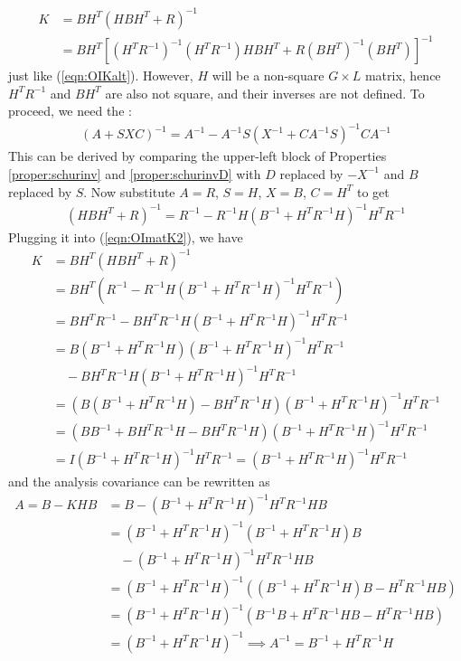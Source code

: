 \begin{align*}
K &= BH^T(HBH^T+R)^{-1} \\
&= BH^T[(H^TR^{-1})^{-1}(H^TR^{-1})HBH^T+R(BH^T)^{-1}(BH^T)]^{-1} 
\end{align*}
just like (\ref{eqn:OIKalt}). However, $H$ will be a non-square $G \times L$ matrix, hence $H^TR^{-1}$ and $BH^T$ are also not square, and their inverses are not defined. To proceed, we need the :
\begin{align}
(A + SXC)^{-1} = A^{-1} - A^{-1}S(X^{-1} + CA^{-1}S)^{-1}CA^{-1}
\end{align}
This can be derived by comparing the upper-left block of Properties \ref{proper:schurinv} and \ref{proper:schurinvD} with $D$ replaced by $-X^{-1}$ and $B$ replaced by $S$. Now substitute $A = R$, $S = H$, $X = B$, $C=H^T$ to get
\begin{align}
(HBH^T + R)^{-1} = R^{-1} - R^{-1}H(B^{-1} + H^TR^{-1}H)^{-1}H^T R^{-1}    
\end{align}
Plugging it into (\ref{eqn:OImatK2}), we have
\begin{align}
K &= BH^T(HBH^T+R)^{-1} \nonumber \\
&= BH^T(R^{-1} - R^{-1}H(B^{-1} + H^TR^{-1}H)^{-1}H^T R^{-1}) \nonumber \\
&= BH^TR^{-1} - BH^TR^{-1}H(B^{-1} + H^TR^{-1}H)^{-1}H^T R^{-1} \nonumber \\
&= B(B^{-1} + H^TR^{-1}H)(B^{-1} + H^TR^{-1}H)^{-1}H^TR^{-1} \nonumber \\
&\quad- BH^TR^{-1}H(B^{-1} + H^TR^{-1}H)^{-1}H^T R^{-1} \nonumber \\
&= (B(B^{-1} + H^TR^{-1}H) - BH^TR^{-1}H)(B^{-1} + H^TR^{-1}H)^{-1}H^TR^{-1} \nonumber \\
&= (BB^{-1} + BH^TR^{-1}H - BH^TR^{-1}H)(B^{-1} + H^TR^{-1}H)^{-1}H^TR^{-1} \nonumber \\
&= I(B^{-1} + H^TR^{-1}H)^{-1}H^TR^{-1} = (B^{-1} + H^TR^{-1}H)^{-1}H^TR^{-1}
\end{align}
and the analysis covariance can be rewritten as
\begin{align}
A = B - KHB &= B - (B^{-1} + H^TR^{-1}H)^{-1}H^TR^{-1}HB \nonumber \\
&= (B^{-1} + H^TR^{-1}H)^{-1}(B^{-1} + H^TR^{-1}H)B \nonumber \\
&\quad- (B^{-1} + H^TR^{-1}H)^{-1}H^TR^{-1}HB \nonumber \\
&= (B^{-1} + H^TR^{-1}H)^{-1}((B^{-1} + H^TR^{-1}H)B - H^TR^{-1}HB) \nonumber \\
&= (B^{-1} + H^TR^{-1}H)^{-1}(B^{-1}B + H^TR^{-1}HB - H^TR^{-1}HB) \nonumber \\
&= (B^{-1} + H^TR^{-1}H)^{-1} \implies A^{-1} = B^{-1} + H^TR^{-1}H
\end{align}

